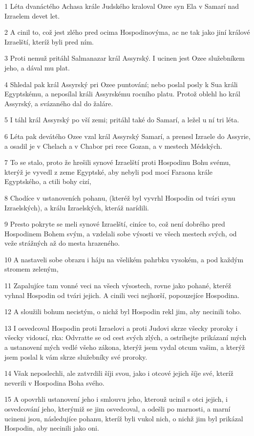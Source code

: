 \par 1 Léta dvanáctého Achasa krále Judského kraloval Ozee syn Ela v Samarí nad Izraelem devet let.
\par 2 A cinil to, což jest zlého pred ocima Hospodinovýma, ac ne tak jako jiní králové Izraelští, kteríž byli pred ním.
\par 3 Proti nemuž pritáhl Salmanazar král Assyrský. I ucinen jest Ozee služebníkem jeho, a dával mu plat.
\par 4 Shledal pak král Assyrský pri Ozee puntování; nebo poslal posly k Sua králi Egyptskému, a neposílal králi Assyrskému rocního platu. Protož oblehl ho král Assyrský, a svázaného dal do žaláre.
\par 5 I táhl král Assyrský po vší zemi; pritáhl také do Samarí, a ležel u ní tri léta.
\par 6 Léta pak devátého Ozee vzal král Assyrský Samarí, a prenesl Izraele do Assyrie, a osadil je v Chelach a v Chabor pri rece Gozan, a v mestech Médských.
\par 7 To se stalo, proto že hrešili synové Izraelští proti Hospodinu Bohu svému, kterýž je vyvedl z zeme Egyptské, aby nebyli pod mocí Faraona krále Egyptského, a ctili bohy cizí,
\par 8 Chodíce v ustanoveních pohanu, (kteréž byl vyvrhl Hospodin od tvári synu Izraelských), a králu Izraelských, kteráž narídili.
\par 9 Presto pokryte se meli synové Izraelští, ciníce to, což není dobrého pred Hospodinem Bohem svým, a vzdelali sobe výsosti ve všech mestech svých, od veže strážných až do mesta hrazeného.
\par 10 A nastaveli sobe obrazu i háju na všelikém pahrbku vysokém, a pod každým stromem zeleným,
\par 11 Zapalujíce tam vonné veci na všech výsostech, rovne jako pohané, kteréž vyhnal Hospodin od tvári jejich. A cinili veci nejhorší, popouzejíce Hospodina.
\par 12 A sloužili bohum necistým, o nichž byl Hospodin rekl jim, aby necinili toho.
\par 13 I osvedcoval Hospodin proti Izraelovi a proti Judovi skrze všecky proroky i všecky vidoucí, rka: Odvratte se od cest svých zlých, a ostríhejte prikázaní mých a ustanovení mých vedlé všeho zákona, kterýž jsem vydal otcum vašim, a kterýž jsem poslal k vám skrze služebníky své proroky.
\par 14 Však neposlechli, ale zatvrdili šíji svou, jako i otcové jejich šíje své, kteríž neverili v Hospodina Boha svého.
\par 15 A opovrhli ustanovení jeho i smlouvu jeho, kterouž ucinil s otci jejich, i osvedcování jeho, kterýmiž se jim osvedcoval, a odešli po marnosti, a marní ucineni jsou, následujíce pohanu, kteríž byli vukol nich, o nichž jim byl prikázal Hospodin, aby necinili jako oni.
